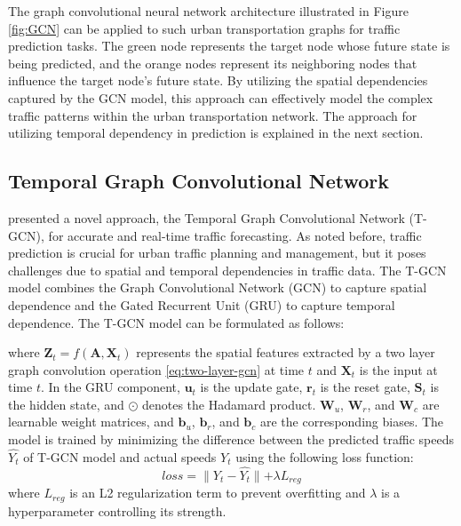 \documentclass[pdflatex,sn-mathphys-num]{sn-jnl}%
\theoremstyle{thmstyleone}%
\theoremstyle{thmstyletwo}%
\theoremstyle{thmstylethree}%
\begin{document}
The graph convolutional neural network architecture illustrated in Figure \ref{fig:GCN} can be applied to such urban transportation graphs for traffic prediction tasks. The green node represents the target node whose future state is being predicted, and the orange nodes represent its neighboring nodes that influence the target node's future state. By utilizing the spatial dependencies captured by the GCN model, this approach can effectively model the complex traffic patterns within the urban transportation network. The approach for utilizing temporal dependency in prediction is explained in the next section.

\subsection{Temporal Graph Convolutional Network}
\cite{zhao2019t} presented a novel approach, the Temporal Graph Convolutional Network (T-GCN), for accurate and real-time traffic forecasting. As noted before, traffic prediction is crucial for urban traffic planning and management, but it poses challenges due to spatial and temporal dependencies in traffic data. The T-GCN model combines the Graph Convolutional Network (GCN) to capture spatial dependence and the Gated Recurrent Unit (GRU) to capture temporal dependence. 
The T-GCN model can be formulated as follows:

where $\mathbf{Z}_t=f(\textbf{A},\textbf{X}_t)$ represents the spatial features extracted by a two layer graph convolution operation \eqref{eq:two-layer-gcn} at time $t$  and  $\mathbf{X}_t$ is the input at time $t$. In the GRU component, $\mathbf{u}_t$ is the update gate, $\mathbf{r}_t$ is the reset gate, $\mathbf{S}_t$ is the hidden state, and $\odot$ denotes the Hadamard product. $\mathbf{W}_u$, $\mathbf{W}_r$, and $\mathbf{W}_c$ are learnable weight matrices, and $\mathbf{b}_u$, $\mathbf{b}_r$, and $\mathbf{b}_c$ are the corresponding biases.
The model is trained by minimizing the difference between the predicted traffic speeds $\widehat{Y_{t}}$ of T-GCN model and actual speeds $Y_{t}$ using the following loss function:
\begin{equation}
loss=\parallel Y_{t}-\widehat{Y_{t}}\parallel+\lambda L_{reg}
\end{equation}
where $L_{reg}$ is an L2 regularization term to prevent overfitting and $\lambda$ is a hyperparameter controlling its strength.
\end{document}
